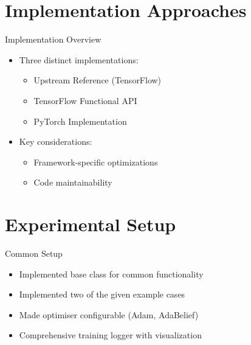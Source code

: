 \documentclass{beamer}
\begin{document}
\section{Implementation Approaches}
\begin{frame}{Implementation Overview}
    \begin{itemize}
        \item Three distinct implementations:
        \begin{itemize}
            \item Upstream Reference (TensorFlow)
            \item TensorFlow Functional API
            \item PyTorch Implementation
        \end{itemize}
        \item Key considerations:
        \begin{itemize}
            \item Framework-specific optimizations
            \item Code maintainability
        \end{itemize}
    \end{itemize}
\end{frame}

\section{Experimental Setup}
\begin{frame}{Common Setup}
    \begin{itemize}
        \item Implemented base class for common functionality
        \item Implemented two of the given example cases
        \item Made optimiser configurable (Adam, AdaBelief)
        \item Comprehensive training logger with visualization
    \end{itemize}
\end{frame}
\end{document}
